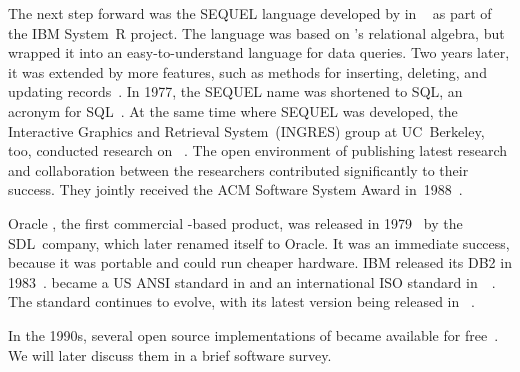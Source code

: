 The next step forward was the SEQUEL language developed by \citeauthor{CB1974SASEQL} in \citeyear{CB1974SASEQL}~\cite{CB1974SASEQL} as part of the IBM System~R project.
The language was based on \citeauthor{C1970ARMODFLSDB}'s relational algebra, but wrapped it into an easy-to-understand language for data queries.
Two years later, it was extended by more features, such as methods for inserting, deleting, and updating records~\cite{CAEGLMRB1976S2AUATDDMAC}.
In 1977, the SEQUEL name was shortened to \acrshort{SQL}, an acronym for \acrfull{SQL}~\cite{C20245YOQ}.
At the same time where SEQUEL was developed, the Interactive Graphics and Retrieval System~(INGRES) group at UC~Berkeley, too, conducted research on ~\cite{S1986TIPAOARDS}.
The open environment of publishing latest research and collaboration between the researchers contributed significantly to their success.
They jointly received the ACM Software System Award in~1988~\cite{C20245YOQ}.

Oracle , the first commercial -based product, was released in 1979~\cite{C20245YOQ} by the SDL~company, which later renamed itself to Oracle.
It was an immediate success, because it was portable and could run cheaper hardware.
IBM released its   DB2 in 1983~\cite{C20245YOQ,HS2013THAGOID}.
 became a US ANSI standard in \citeyear{ANSIX3135} and an international ISO standard in~\citeyear{ISO90751987}~\cite{ANSIX3135,ISO90751987}.
The standard continues to evolve, with its latest version being released in \citeyear{ISOIEC9707112023E}~\cite{ISOIEC9707112023E}.

In the 1990s, several open source implementations of  became available for free~\cite{C20245YOQ}.
We will later discuss them in a brief software survey.%
%
\endhsection%
%
